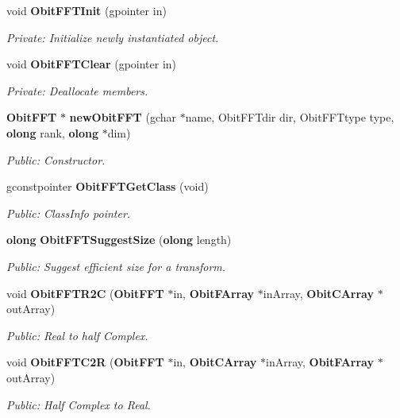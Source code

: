 \begin{CompactItemize}
\item 
void {\bf Obit\-FFTInit} (gpointer in)
\begin{CompactList}\small\item\em Private: Initialize newly instantiated object. \item\end{CompactList}\item 
void {\bf Obit\-FFTClear} (gpointer in)
\begin{CompactList}\small\item\em Private: Deallocate members. \item\end{CompactList}\item 
{\bf Obit\-FFT} $\ast$ {\bf new\-Obit\-FFT} (gchar $\ast$name, Obit\-FFTdir dir, Obit\-FFTtype type, {\bf olong} rank, {\bf olong} $\ast$dim)
\begin{CompactList}\small\item\em Public: Constructor. \item\end{CompactList}\item 
gconstpointer {\bf Obit\-FFTGet\-Class} (void)
\begin{CompactList}\small\item\em Public: Class\-Info pointer. \item\end{CompactList}\item 
{\bf olong} {\bf Obit\-FFTSuggest\-Size} ({\bf olong} length)
\begin{CompactList}\small\item\em Public: Suggest efficient size for a transform. \item\end{CompactList}\item 
void {\bf Obit\-FFTR2C} ({\bf Obit\-FFT} $\ast$in, {\bf Obit\-FArray} $\ast$in\-Array, {\bf Obit\-CArray} $\ast$out\-Array)
\begin{CompactList}\small\item\em Public: Real to half Complex. \item\end{CompactList}\item 
void {\bf Obit\-FFTC2R} ({\bf Obit\-FFT} $\ast$in, {\bf Obit\-CArray} $\ast$in\-Array, {\bf Obit\-FArray} $\ast$out\-Array)
\begin{CompactList}\small\item\em Public: Half Complex to Real. \item\end{CompactList}\item 

\end{CompactItemize}
